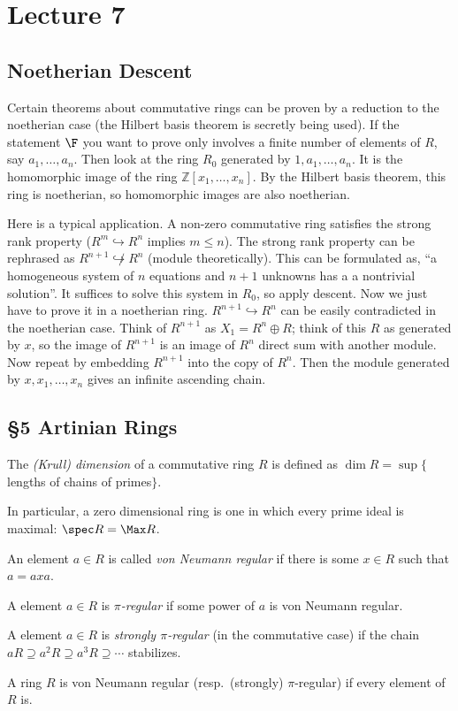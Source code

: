  \section{Lecture 7}

 \subsection{Noetherian Descent}

 Certain theorems about commutative rings can be proven by a reduction to the noetherian
 case (the Hilbert basis theorem is secretly being used). If the statement $\F$ you want
 to prove only involves a finite number of elements of $R$, say $a_1,\dots, a_n$. Then
 look at the ring $R_0$ generated by $1, a_1,\dots, a_n$. It is the homomorphic image of
 the ring $\mathbb{Z}[x_1,\dots, x_n]$. By the Hilbert basis theorem, this ring is noetherian,
 so homomorphic images are also noetherian.

 Here is a typical application. A non-zero commutative ring satisfies the strong rank
 property ($R^m\hookrightarrow R^n$ implies $m\le n$). The strong rank property can be
 rephrased as $R^{n+1}\not\hookrightarrow R^n$ (module theoretically). This can be
 formulated as, ``a homogeneous system of $n$ equations and $n+1$ unknowns has a a
 nontrivial solution''. It suffices to solve this system in $R_0$, so apply descent. Now
 we just have to prove it in a noetherian ring. $R^{n+1}\hookrightarrow R^n$ can be
 easily contradicted in the noetherian case. Think of $R^{n+1}$ as $X_1=R^n\oplus R$;
 think of this $R$ as generated by $x$, so the image of $R^{n+1}$ is an image of $R^n$
 direct sum with another module. Now repeat by embedding $R^{n+1}$ into the copy of
 $R^n$. Then the module generated by $x,x_1,\dots, x_n$ gives an infinite ascending
 chain.

 \subsection{\S 5 Artinian Rings}

 \begin{definition}
   The \emph{(Krull) dimension} of a commutative ring $R$ is defined as $\dim R =
   \sup\{$lengths of chains of primes$\}$.
 \end{definition}
 In particular, a zero dimensional ring is one in which every prime ideal is maximal:
 $\spec R=\Max R$.

 \begin{definition}
   An element $a\in R$ is called \emph{von Neumann regular} if there is some $x\in R$
   such that $a=axa$.
 \end{definition}
 \begin{definition}[McCoy]
   A element $a\in R$ is \emph{$\pi$-regular} if some power of $a$ is von Neumann
   regular.
 \end{definition}
 \begin{definition}
   A element $a\in R$ is \emph{strongly $\pi$-regular} (in the commutative case)
   if the chain $aR\supseteq a^2R\supseteq a^3R\supseteq \cdots$ stabilizes.
 \end{definition}
 A ring $R$ is von Neumann regular (resp.\ (strongly) $\pi$-regular) if every element of
 $R$ is.


